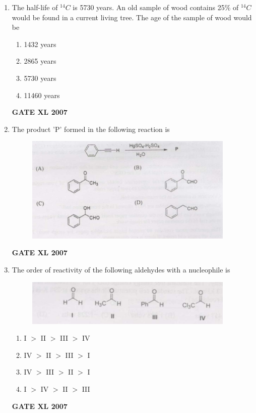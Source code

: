 \documentclass[journal,12pt,onecolumn]{IEEEtran}
\begin{document}
\begin{enumerate}
    \item The half-life of $^{14}C$ is 5730 years. An old sample of wood contains 25\% of $^{14}C$ would be found in a current living tree. The age of the sample of wood would be 
    \begin{multicols}{4}
        \begin{enumerate}
            \item 1432 years
            \item 2865 years
            \item 5730 years
            \item 11460 years
        \end{enumerate}
    \end{multicols}
	    \hfill \textbf{GATE XL 2007}%

    \item The product 'P' formed in the following reaction is 
\begin{figure}[h!]
	\centering
	\includegraphics[width=10cm]{5}
	\caption*{}
	\label{fig:Q5}
	\end{figure}



	    \hfill \textbf{GATE XL 2007}%

    \item The order of reactivity of the following aldehydes with a nucleophile is %
    
\begin{figure}[h!]
	\centering
	\includegraphics[width=10cm]{6}
	\caption*{}
	\label{fig:Q6}
	\end{figure}
    \begin{multicols}{2}
        \begin{enumerate}
            \item I $>$ II $>$ III $>$ IV
            \item IV $>$ II $>$ III $>$ I
            \item IV $>$ III $>$ II $>$ I
            \item I $>$ IV $>$ II $>$ III
        \end{enumerate}
    \end{multicols}
	    \hfill \textbf{GATE XL 2007}
\end{enumerate}
\end{document}
